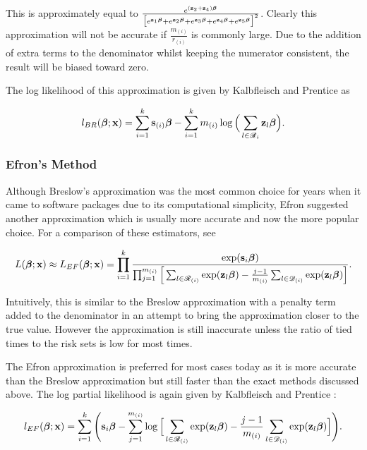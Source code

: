 This is approximately equal to $\frac{e^{(\textbf{z}_2+\textbf{z}_4)\boldsymbol{\beta}}}{\big[e^{\textbf{z}_1\boldsymbol{\beta}}+e^{\textbf{z}_2\boldsymbol{\beta}}+e^{\textbf{z}_3\boldsymbol{\beta}}+e^{\textbf{z}_4\boldsymbol{\beta}}+e^{\textbf{z}_5\boldsymbol{\beta}}\big]^2}$. Clearly this approximation will not be accurate if $\frac{m_{(i)}}{r_{(i)}}$ is commonly large. Due to the addition of extra terms to the denominator whilst keeping the numerator consistent, the result will be biased toward zero. 

The log likelihood of this approximation is given by Kalbfleisch and Prentice  as

\begin{equation}
    l_{BR}(\boldsymbol{\beta};\textbf{x})=\sum_{i=1}^{k}\textbf{s}_{(i)}\boldsymbol{\beta} - \sum_{i=1}^km_{(i)}\log\Big(\sum_{l\in\mathscr{R}_i}\textbf{z}_l\boldsymbol{\beta}\Big).
\end{equation}

\subsubsection{Efron's Method}

Although Breslow's approximation was the most common choice for years when it came to software packages due to its computational simplicity, Efron  suggested another approximation which is usually more accurate and now the more popular choice. For a comparison of these estimators, see 

\begin{equation}
    L(\boldsymbol{\beta};\textbf{x})\approx L_{EF}(\boldsymbol{\beta};\textbf{x})=\prod_{i=1}^k\frac{\exp(\textbf{s}_i\boldsymbol{\beta})}{\prod_{j=1}^{m_{(i)}}\Big[\sum_{l\in\mathscr{R}_{(i)}}\exp(\textbf{z}_l\boldsymbol{\beta})-\frac{j-1}{m_{(i)}}\sum_{l\in\mathscr{D}_{(i)}}\exp(\textbf{z}_l\boldsymbol{\beta})\Big]}.
\end{equation}

Intuitively, this is similar to the Breslow approximation with a penalty term added to the denominator in an attempt to bring the approximation closer to the true value. However the approximation is still inaccurate unless the ratio of tied times to the risk sets is low for most times.

The Efron approximation is preferred for most cases today as it is more accurate than the Breslow approximation but still faster than the exact methods discussed above. The log partial likelihood is again given by Kalbfleisch and Prentice :

\begin{equation}
    l_{EF}(\boldsymbol{\beta};\textbf{x})=\sum_{i=1}^k\Bigg(\textbf{s}_i\boldsymbol{\beta} - \sum_{j=1}^{m_{(i)}}\log\Big[\sum_{l\in\mathscr{R}_{(i)}}\exp(\textbf{z}_l\boldsymbol{\beta})-\frac{j-1}{m_{(i)}}\sum_{l\in\mathscr{D}_{(i)}}\exp(\textbf{z}_l\boldsymbol{\beta})\Big]\Bigg).
\end{equation}

